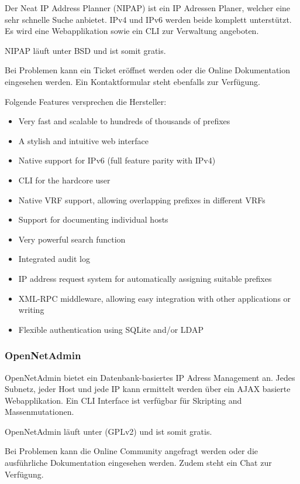 \documentclass[11pt,a4paper,parskip=half]{scrartcl}
\begin{document}
Der Neat IP Address Planner (NIPAP) ist ein IP Adressen Planer, welcher eine sehr schnelle Suche anbietet. IPv4 und IPv6 werden beide komplett unterstützt. Es wird eine Webapplikation sowie ein CLI zur Verwaltung angeboten.

NIPAP läuft unter BSD und ist somit gratis.

Bei Problemen kann ein Ticket eröffnet werden oder die Online Dokumentation eingesehen werden. Ein Kontaktformular steht ebenfalls zur Verfügung.

Folgende Features versprechen die Hersteller:
\begin{itemize}
\item{Very fast and scalable to hundreds of thousands of prefixes}
\item{A stylish and intuitive web interface}
\item{Native support for IPv6 (full feature parity with IPv4)}
\item{CLI for the hardcore user}
\item{Native VRF support, allowing overlapping prefixes in different VRFs}
\item{Support for documenting individual hosts}
\item{Very powerful search function}
\item{Integrated audit log}
\item{IP address request system for automatically assigning suitable prefixes}
\item{XML-RPC middleware, allowing easy integration with other applications or writing}
\item{Flexible authentication using SQLite and/or LDAP}
\end{itemize}

\subsubsection{OpenNetAdmin}
OpenNetAdmin bietet ein Datenbank-basiertes IP Adress Management an. Jedes Subnetz, jeder Host und jede IP kann ermittelt werden über ein AJAX basierte Webapplikation. Ein CLI Interface ist verfügbar für Skripting and Massenmutationen.

OpenNetAdmin läuft unter (GPLv2) und ist somit gratis.

Bei Problemen kann die Online Community angefragt werden oder die ausführliche Dokumentation eingesehen werden. Zudem steht ein Chat zur Verfügung.
\end{document}

